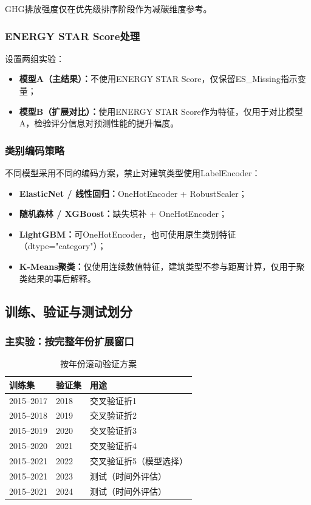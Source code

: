 GHG排放强度仅在优先级排序阶段作为减碳维度参考。

\subsubsection{ENERGY STAR Score处理}

设置两组实验：
\begin{itemize}
    \item \textbf{模型A（主结果）：}不使用ENERGY STAR Score，仅保留ES\_Missing指示变量；
    \item \textbf{模型B（扩展对比）：}使用ENERGY STAR Score作为特征，仅用于对比模型A，检验评分信息对预测性能的提升幅度。
\end{itemize}

\subsubsection{类别编码策略}

不同模型采用不同的编码方案，禁止对建筑类型使用LabelEncoder：
\begin{itemize}
    \item \textbf{ElasticNet / 线性回归：}OneHotEncoder + RobustScaler；
    \item \textbf{随机森林 / XGBoost：}缺失填补 + OneHotEncoder；
    \item \textbf{LightGBM：}可OneHotEncoder，也可使用原生类别特征（dtype="category"）；
    \item \textbf{K-Means聚类：}仅使用连续数值特征，建筑类型不参与距离计算，仅用于聚类结果的事后解释。
\end{itemize}

\subsection{训练、验证与测试划分}

\subsubsection{主实验：按完整年份扩展窗口}

\begin{table}[H]
\centering
\caption{按年份滚动验证方案}
\label{tab:split}
\begin{tabular}{p{3cm}p{3cm}p{2.5cm}}
\hline
\textbf{训练集} & \textbf{验证集} & \textbf{用途} \\
\hline
2015--2017 & 2018 & 交叉验证折1 \\
2015--2018 & 2019 & 交叉验证折2 \\
2015--2019 & 2020 & 交叉验证折3 \\
2015--2020 & 2021 & 交叉验证折4 \\
2015--2021 & 2022 & 交叉验证折5（模型选择） \\
\hline
2015--2021 & 2023 & 测试（时间外评估） \\
2015--2021 & 2024 & 测试（时间外评估） \\
\hline
\end{tabular}
\end{table}

